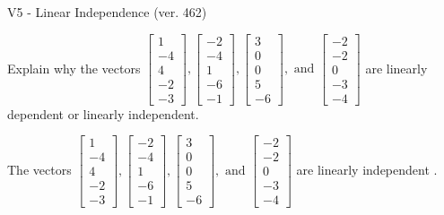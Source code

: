 \begin{exercise}
  \begin{exerciseTitle}V5 - Linear Independence (ver. 462)\end{exerciseTitle}
  \begin{exerciseStatement}
    Explain why the vectors \(\left[\begin{array}{r}
1 \\
-4 \\
4 \\
-2 \\
-3
\end{array}\right] , \left[\begin{array}{r}
-2 \\
-4 \\
1 \\
-6 \\
-1
\end{array}\right] , \left[\begin{array}{r}
3 \\
0 \\
0 \\
5 \\
-6
\end{array}\right] , \text{ and } \left[\begin{array}{r}
-2 \\
-2 \\
0 \\
-3 \\
-4
\end{array}\right]\) are linearly dependent or linearly independent.	


  \end{exerciseStatement}
  \begin{exerciseAnswer}
   The vectors \(\left[\begin{array}{r}
1 \\
-4 \\
4 \\
-2 \\
-3
\end{array}\right] , \left[\begin{array}{r}
-2 \\
-4 \\
1 \\
-6 \\
-1
\end{array}\right] , \left[\begin{array}{r}
3 \\
0 \\
0 \\
5 \\
-6
\end{array}\right] , \text{ and } \left[\begin{array}{r}
-2 \\
-2 \\
0 \\
-3 \\
-4
\end{array}\right]\) are 
  	 linearly independent  .
  


  \end{exerciseAnswer}
\end{exercise}